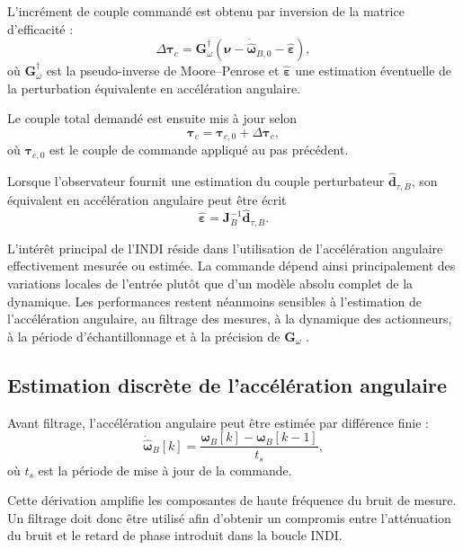 \documentclass[11pt,a4paper,oneside]{report}
\newcommand{\vect}[1]{\bm{#1}}
\newcommand{\mat}[1]{\bm{#1}}
\begin{document}
L'incrément de couple commandé est obtenu par inversion de la matrice d'efficacité :
\begin{equation}
	\Delta\vect\tau_c
	=
	\mat G_\omega^\dagger
	\left(
	\vect\nu
	-
	\dot{\hat{\vect\omega}}_{B,0}
	-
	\hat{\vect\varepsilon}
	\right),
	\label{eq_indi_control_increment}
\end{equation}
où $\mat G_\omega^\dagger$ est la pseudo-inverse de Moore--Penrose et $\hat{\vect\varepsilon}$ une estimation éventuelle de la perturbation équivalente en accélération angulaire.

Le couple total demandé est ensuite mis à jour selon
\begin{equation}
	\vect\tau_c
	=
	\vect\tau_{c,0}
	+
	\Delta\vect\tau_c,
	\label{eq_indi_control}
\end{equation}
où $\vect\tau_{c,0}$ est le couple de commande appliqué au pas précédent.

Lorsque l'observateur fournit une estimation du couple perturbateur $\hat{\vect d}_{\tau,B}$, son équivalent en accélération angulaire peut être écrit
\begin{equation}
	\hat{\vect\varepsilon}
	=
	\mat J_B^{-1}
	\hat{\vect d}_{\tau,B}.
	\label{eq_disturbance_acceleration_equivalent}
\end{equation}

L'intérêt principal de l'INDI réside dans l'utilisation de l'accélération angulaire effectivement mesurée ou estimée. La commande dépend ainsi principalement des variations locales de l'entrée plutôt que d'un modèle absolu complet de la dynamique. Les performances restent néanmoins sensibles à l'estimation de l'accélération angulaire, au filtrage des mesures, à la dynamique des actionneurs, à la période d'échantillonnage et à la précision de $\mat G_\omega$ \cite{KimKim2024}.

\subsection{Estimation discrète de l'accélération angulaire}

Avant filtrage, l'accélération angulaire peut être estimée par différence finie :
\begin{equation}
	\dot{\hat{\vect\omega}}_B[k]
	=
	\frac{
		\vect\omega_B[k]-\vect\omega_B[k-1]
	}{t_s},
	\label{eq_body_rate_derivative_discrete}
\end{equation}
où $t_s$ est la période de mise à jour de la commande.

Cette dérivation amplifie les composantes de haute fréquence du bruit de mesure. Un filtrage doit donc être utilisé afin d'obtenir un compromis entre l'atténuation du bruit et le retard de phase introduit dans la boucle INDI.
\end{document}
